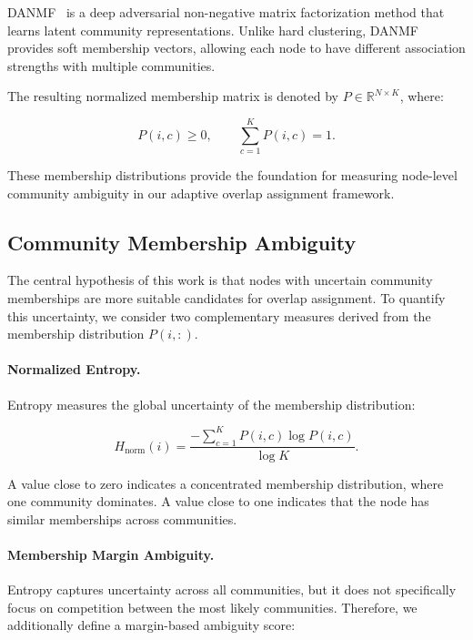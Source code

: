 \documentclass[pdflatex,sn-mathphys-num]{sn-jnl}%
\theoremstyle{thmstyleone}%
\theoremstyle{thmstyletwo}%
\theoremstyle{thmstylethree}%
\begin{document}
DANMF~\citep{DANMF} is a deep adversarial non-negative matrix factorization method that learns latent community representations.
Unlike hard clustering, DANMF provides soft membership vectors, allowing each node to have different association strengths with multiple communities.

The resulting normalized membership matrix is denoted by
$P\in\mathbb{R}^{N\times K}$,
where:

\begin{equation}
P(i,c)\geq0,
\qquad
\sum_{c=1}^{K}P(i,c)=1.
\end{equation}

These membership distributions provide the foundation for measuring node-level community ambiguity in our adaptive overlap assignment framework.

\subsection{Community Membership Ambiguity}
\label{subsec:ambiguity}

The central hypothesis of this work is that nodes with uncertain community memberships are more suitable candidates for overlap assignment.
To quantify this uncertainty, we consider two complementary measures derived from the membership distribution $P(i,:)$.

\paragraph{Normalized Entropy.}

Entropy measures the global uncertainty of the membership distribution:

\begin{equation}
H_{\mathrm{norm}}(i)
=
\frac{
-\sum_{c=1}^{K}P(i,c)\log P(i,c)
}
{\log K}.
\label{eq:entropy}
\end{equation}

A value close to zero indicates a concentrated membership distribution, where one community dominates.
A value close to one indicates that the node has similar memberships across communities.

\paragraph{Membership Margin Ambiguity.}

Entropy captures uncertainty across all communities, but it does not specifically focus on competition between the most likely communities.
Therefore, we additionally define a margin-based ambiguity score:
\end{document}
